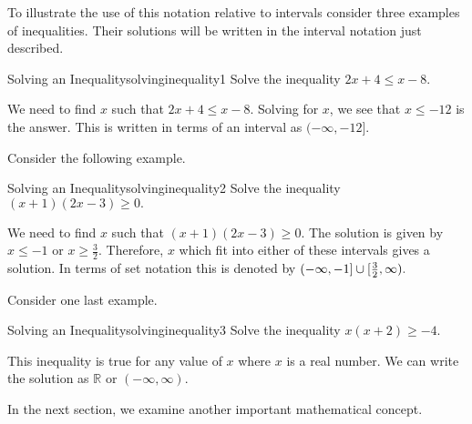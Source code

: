 To illustrate the use of this notation relative to intervals consider three
examples of inequalities. Their solutions will be written in the interval notation
just described.

\begin{example}{Solving an Inequality}{solvinginequality1}
Solve the inequality $2x+4\leq x-8$.
\end{example}

\begin{solution}
We need to find $x$ such that $2x+4\leq x-8$. Solving for $x$, we see that 
$x\leq -12$ is the answer. This is written in terms of an interval as $(-\infty ,-12].$
\end{solution}

Consider the following example.

\begin{example}{Solving an Inequality}{solvinginequality2}
Solve the inequality $\left( x+1\right) \left( 2x-3\right) \geq0.$
\end{example}

\begin{solution}
We need to find $x$ such that $\left( x+1\right) \left( 2x-3\right) \geq0.$ 
The solution is given by  $x\leq -1$ or $x\geq \frac{3}{2}$. Therefore, 
$x$ which fit into either of these intervals gives a solution. In terms of set notation this is denoted by $(-\infty ,-1]\cup
[ \vspace{0.05in}\frac{3}{2},\infty ).$
\end{solution}

Consider one last example.

\begin{example}{Solving an Inequality}{solvinginequality3}
Solve the inequality $x \left( x+2\right) \geq-4$.
\end{example}

\begin{solution}
This inequality is true for any value of $x$ where $x$ is a real number. We can write the solution as $\mathbb{R}$ or $\left(
-\infty ,\infty \right) .$
\end{solution}

In the next section, we examine another important mathematical concept.
